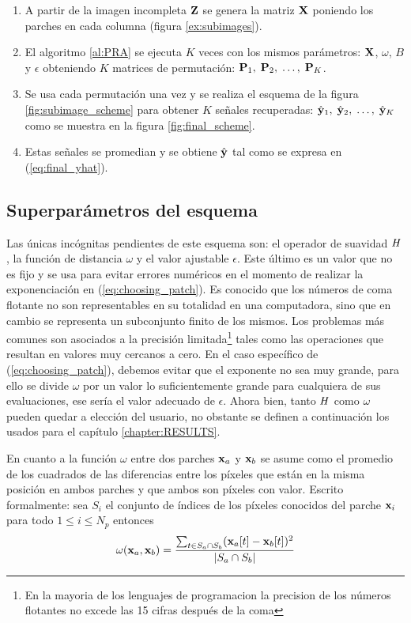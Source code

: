 \begin{enumerate}
	\item A partir de la imagen incompleta $\Z$ se genera la matriz $\X$ poniendo los parches en cada columna (figura \ref{ex:subimages}).
	\item El algoritmo \ref{al:PRA} se ejecuta $K$ veces con los mismos par\'ametros: $\X$, $\omega$, $B$ y $\epsilon$ obteniendo $K$ matrices de permutaci\'on: $\P_1,\; \P_2,\; \dots,\; \P_K$.
	\item Se usa cada permutaci\'on una vez y se realiza el esquema de la figura \ref{fig:subimage_scheme} para obtener $K$ señales recuperadas: $\yhat_1,\; \yhat_2,\; \dots,\; \yhat_K$ como se muestra en la figura \ref{fig:final_scheme}.
	\item Estas señales se promedian y se obtiene $\yhat$ tal como se expresa en (\ref{eq:final_yhat}).
\end{enumerate}

\subsection{Superpar\'ametros del esquema}
Las \'unicas incógnitas pendientes de este esquema son: el operador de suavidad $\H$, la funci\'on de distancia $\omega$ y el valor ajustable $\epsilon$. Este \'ultimo es un valor que no es fijo y se usa para evitar errores num\'ericos en el momento de realizar la exponenciaci\'on en (\ref{eq:choosing_patch}). Es conocido que los n\'umeros de coma flotante no son representables en su totalidad en una computadora, sino que en cambio se representa un subconjunto finito de los mismos. Los problemas m\'as comunes son asociados a la precisión limitada\footnote{En la mayoria de los lenguajes de programacion la precision de los n\'umeros flotantes no excede las 15 cifras despu\'es de la coma} tales como las operaciones que resultan en valores muy cercanos a cero. En el caso espec\'ifico de (\ref{eq:choosing_patch}), debemos evitar que el exponente no sea muy grande, para ello se divide $\omega$ por un valor lo suficientemente grande para cualquiera de sus evaluaciones, ese ser\'ia el valor adecuado de $\epsilon$. Ahora bien, tanto $\H$ como $\omega$ pueden quedar a elecci\'on del usuario, no obstante se definen a continuaci\'on los usados para el cap\'itulo \ref{chapter:RESULTS}.

En cuanto a la funci\'on $\omega$ entre dos parches $\x_a$ y $\x_b$ se asume como el promedio de los cuadrados de las diferencias entre los p\'ixeles que est\'an en la misma posici\'on en ambos parches y que ambos son p\'ixeles con valor. Escrito formalmente: sea $S_i$ el conjunto de \'indices de los p\'ixeles conocidos del parche $\x_i$ para todo $1 \le i \le N_p$ entonces
\begin{equation}
\omega(\x_a, \x_b) = \frac{\sum_{t \in S_a \cap S_b} (\x_a[t] - \x_b[t])^2}{|S_a \cap S_b|}
\end{equation}

